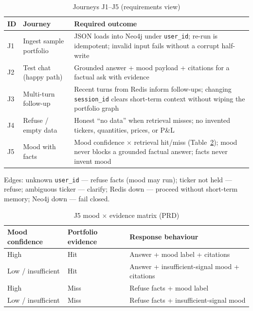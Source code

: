 \begin{table}[!htbp]
\centering
\small
\caption{Journeys J1--J5 (requirements view)}
\label{tab:journeys}
\begin{tabularx}{\textwidth}{@{}
  >{\centering\arraybackslash}p{}
  >{\raggedright\arraybackslash}p{}
  >{\raggedright\arraybackslash}X
  @{}}
\toprule
\textbf{ID} & \textbf{Journey} & \textbf{Required outcome} \\
\midrule
J1 &
Ingest sample portfolio &
JSON loads into Neo4j under \texttt{user\_id}; re-run is idempotent; invalid input fails without a corrupt half-write \\
\addlinespace
J2 &
Test chat (happy path) &
Grounded answer + mood payload + citations for a factual ask with evidence \\
\addlinespace
J3 &
Multi-turn follow-up &
Recent turns from Redis inform follow-ups; changing \texttt{session\_id} clears short-term context without wiping the portfolio graph \\
\addlinespace
J4 &
Refuse / empty data &
Honest ``no data'' when retrieval misses; no invented tickers, quantities, prices, or P\&L \\
\addlinespace
J5 &
Mood with facts &
Mood confidence $\times$ retrieval hit/miss (Table~\ref{tab:j5-mood}); mood never blocks a grounded factual answer; facts never invent mood \\
\bottomrule
\end{tabularx}
\end{table}

\noindent
Edges: unknown \texttt{user\_id} --- refuse facts (mood may run); ticker not held --- refuse; ambiguous ticker --- clarify; Redis down --- proceed without short-term memory; Neo4j down --- fail closed.

\begin{table}[!htbp]
\centering
\small
\caption{J5 mood $\times$ evidence matrix (PRD)}
\label{tab:j5-mood}
\begin{tabularx}{\textwidth}{@{}lll@{}}
\toprule
\textbf{Mood confidence} & \textbf{Portfolio evidence} & \textbf{Response behaviour} \\
\midrule
High & Hit & Answer + mood label + citations \\
Low / insufficient & Hit & Answer + insufficient-signal mood + citations \\
High & Miss & Refuse facts + mood label \\
Low / insufficient & Miss & Refuse facts + insufficient-signal mood \\
\bottomrule
\end{tabularx}
\end{table}

